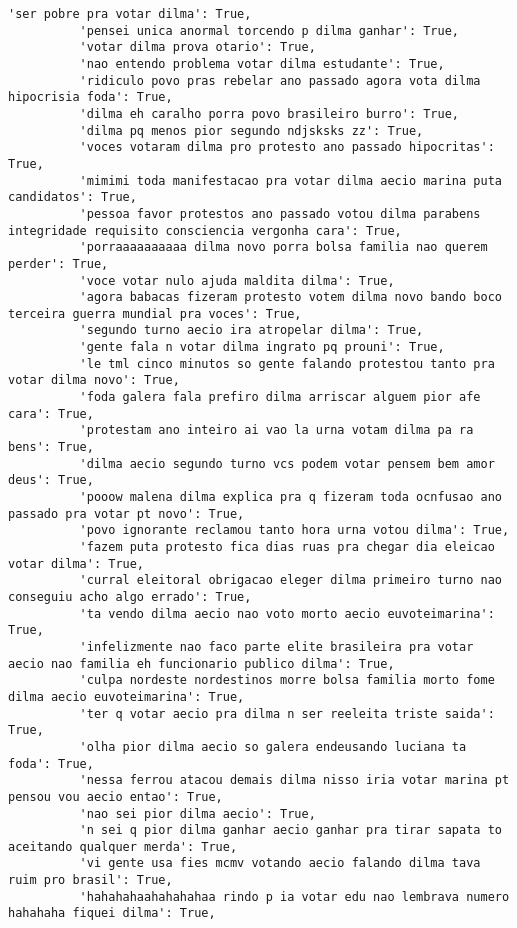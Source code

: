 \documentclass[11pt]{article}
\begin{document}
\begin{Verbatim}[commandchars=\\\{\}]
          'ser pobre pra votar dilma': True,
          'pensei unica anormal torcendo p dilma ganhar': True,
          'votar dilma prova otario': True,
          'nao entendo problema votar dilma estudante': True,
          'ridiculo povo pras rebelar ano passado agora vota dilma hipocrisia foda': True,
          'dilma eh caralho porra povo brasileiro burro': True,
          'dilma pq menos pior segundo ndjsksks zz': True,
          'voces votaram dilma pro protesto ano passado hipocritas': True,
          'mimimi toda manifestacao pra votar dilma aecio marina puta candidatos': True,
          'pessoa favor protestos ano passado votou dilma parabens integridade requisito consciencia vergonha cara': True,
          'porraaaaaaaaaa dilma novo porra bolsa familia nao querem perder': True,
          'voce votar nulo ajuda maldita dilma': True,
          'agora babacas fizeram protesto votem dilma novo bando boco terceira guerra mundial pra voces': True,
          'segundo turno aecio ira atropelar dilma': True,
          'gente fala n votar dilma ingrato pq prouni': True,
          'le tml cinco minutos so gente falando protestou tanto pra votar dilma novo': True,
          'foda galera fala prefiro dilma arriscar alguem pior afe cara': True,
          'protestam ano inteiro ai vao la urna votam dilma pa ra bens': True,
          'dilma aecio segundo turno vcs podem votar pensem bem amor deus': True,
          'pooow malena dilma explica pra q fizeram toda ocnfusao ano passado pra votar pt novo': True,
          'povo ignorante reclamou tanto hora urna votou dilma': True,
          'fazem puta protesto fica dias ruas pra chegar dia eleicao votar dilma': True,
          'curral eleitoral obrigacao eleger dilma primeiro turno nao conseguiu acho algo errado': True,
          'ta vendo dilma aecio nao voto morto aecio euvoteimarina': True,
          'infelizmente nao faco parte elite brasileira pra votar aecio nao familia eh funcionario publico dilma': True,
          'culpa nordeste nordestinos morre bolsa familia morto fome dilma aecio euvoteimarina': True,
          'ter q votar aecio pra dilma n ser reeleita triste saida': True,
          'olha pior dilma aecio so galera endeusando luciana ta foda': True,
          'nessa ferrou atacou demais dilma nisso iria votar marina pt pensou vou aecio entao': True,
          'nao sei pior dilma aecio': True,
          'n sei q pior dilma ganhar aecio ganhar pra tirar sapata to aceitando qualquer merda': True,
          'vi gente usa fies mcmv votando aecio falando dilma tava ruim pro brasil': True,
          'hahahahaahahahahaa rindo p ia votar edu nao lembrava numero hahahaha fiquei dilma': True,

\end{Verbatim}
\end{document}
